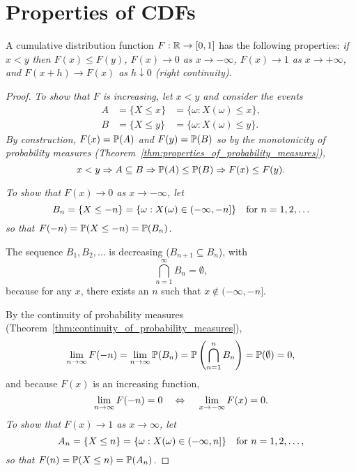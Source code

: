 \section{Properties of CDFs}

\begin{theorem}\label{thm:properties_cdf}
A cumulative distribution function $F:\mathbb{R}\to[0,1]$ has the following properties:
\ben
\it if $x < y$ then $F(x) \leq F(y)$,
\it $F(x)\to 0$ as $x\to-\infty$,
\it $F(x)\to 1$ as $x\to+\infty$, and
\it $F(x+h)\to F(x)$ as $h\downarrow 0$ (right continuity).
\een
\end{theorem}

\begin{proof}
\ben
\it %
To show that $F$ is increasing, let $x < y$ and consider the events 
\[\begin{array}{lll}
A	& = \{X\leq x\}	& = \{\omega: X(\omega)\leq x\}, \\
B	& = \{X\leq y\}	& = \{\omega: X(\omega)\leq y\}.
\end{array}\]
By construction, $F(x)=\mathbb{P}(A)$ and $F(y)=\mathbb{P}(B)$ so by the monotonicity of probability measures (Theorem~\ref{thm:properties_of_probability_measures}), 
\[
x< y \Rightarrow A\subseteq B \Rightarrow \mathbb{P}(A) \leq \mathbb{P}(B) \Rightarrow F(x) \leq F(y).
\]

\it %
To show that $F(x)\to 0$ as $x\to-\infty$, let
\[
B_n = \{X\leq -n\} = \{\omega:X(\omega)\in (-\infty,-n]\} \text{\quad for } n=1,2,\ldots
\]
so that $F(-n)= \mathbb{P}(X\leq -n) = \mathbb{P}(B_n)$. 

The sequence $B_1,B_2,\ldots$ is decreasing ($B_{n+1}\subseteq B_n$), with 
\[
\bigcap_{n=1}^{\infty} B_n = \emptyset,
\]
because for any $x$, there exists an $n$ such that $x\notin (-\infty,-n]$.
\par
By the continuity of probability measures (Theorem~\ref{thm:continuity_of_probability_measures}),
\[
\lim_{n\to\infty}F(-n) = \lim_{n\to\infty}\mathbb{P}(B_n) = \mathbb{P}\left(\bigcap_{n=1}^n B_n\right) = \mathbb{P}(\emptyset) = 0,
\]
and because $F(x)$ is an increasing function,
\[
\lim_{n\to\infty}F(-n)=0 \text{\quad} \Leftrightarrow \text{\quad} \lim_{x\to-\infty}F(x)=0.
\]
\it %
To show that $F(x)\to 1$ as $x\to\infty$, let
\[
A_n = \{X\leq n\} =  \{\omega:X(\omega)\in (-\infty,n]\}\text{\quad for } n=1,2,\ldots,
\]
so that $F(n)= \mathbb{P}(X\leq n) = \mathbb{P}(A_n)$.


\end{proof}
